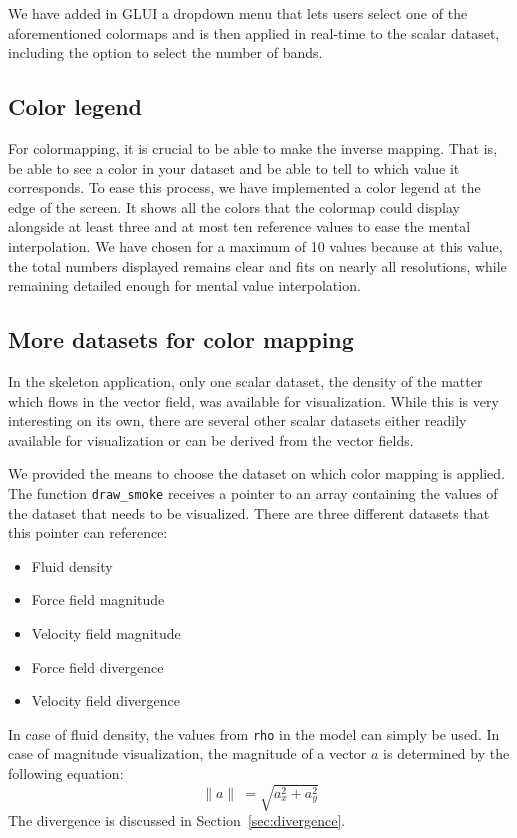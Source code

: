 		We have added in GLUI a dropdown menu that lets users select one of the aforementioned colormaps and is then applied in real-time to the scalar dataset, including the option to select the number of bands.

	\subsection{Color legend}
		For colormapping, it is crucial to be able to make the inverse mapping. 
		That is, be able to see a color in your dataset and be able to tell to which value it corresponds.
		To ease this process, we have implemented a color legend at the edge of the screen.
		It shows all the colors that the colormap could display alongside at least three and at most ten reference values to ease the mental interpolation.
		We have chosen for a maximum of 10 values because at this value, the total numbers displayed remains clear and fits on nearly all resolutions, while remaining detailed enough for mental value interpolation.

	\subsection{More datasets for color mapping}
		In the skeleton application, only one scalar dataset, the density of the matter which flows in the vector field, was available for visualization.
		While this is very interesting on its own, there are several other scalar datasets either readily available for visualization or can be derived from the vector fields.
		
		We provided the means to choose the dataset on which color mapping is applied.
		The function \texttt{draw\_smoke} receives a pointer to an array containing the values of the dataset that needs to be visualized.
		There are three different datasets that this pointer can reference:
		\begin{itemize}
			\item Fluid density
			\item Force field magnitude
			\item Velocity field magnitude
			\item Force field divergence
			\item Velocity field divergence
		\end{itemize}
		In case of fluid density, the values from \texttt{rho} in the model can simply be used.
		In case of magnitude visualization, the magnitude of a vector \(a\) is determined by the following equation:
		\[\| a \|\ = \sqrt{a_x^2 + a_y^2}\]
		The divergence is discussed in Section~\ref{sec:divergence}.
